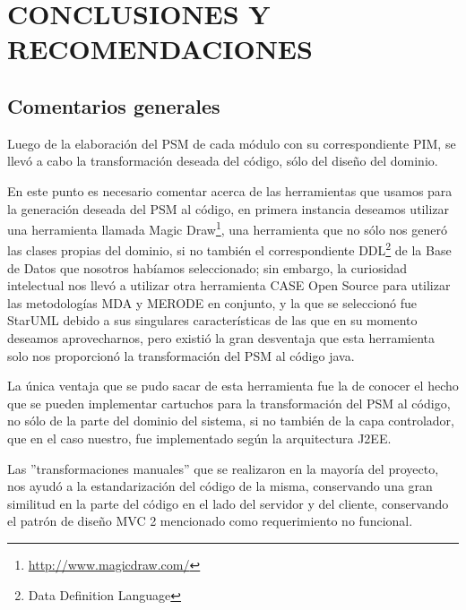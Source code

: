 \chapter*{CONCLUSIONES Y RECOMENDACIONES}
\section{Comentarios generales}

\begin{indentar}
Luego de la elaboraci\'on del PSM de cada m\'odulo con su correspondiente PIM, se llev\'o a cabo la transformaci\'on deseada del c\'odigo, s\'olo del dise\~no del dominio.

En este punto es necesario comentar acerca de las herramientas que usamos para la generaci\'on deseada del PSM al c\'odigo, en primera instancia deseamos utilizar una herramienta llamada Magic Draw\footnote{\url{http://www.magicdraw.com/}}, una herramienta que no s\'olo nos gener\'o las clases propias del dominio, si no tambi\'en el correspondiente DDL\footnote{Data Definition Language} de la Base de Datos que nosotros hab\'iamos seleccionado; sin embargo, la curiosidad intelectual nos llev\'o a utilizar otra herramienta CASE Open Source para utilizar las metodolog\'ias MDA y MERODE en conjunto, y la que se seleccion\'o fue StarUML debido a sus singulares caracter\'isticas de las que en su momento deseamos aprovecharnos, pero existi\'o la gran desventaja que esta herramienta solo nos proporcion\'o la transformaci\'on del PSM al c\'odigo java.

La \'unica ventaja que se pudo sacar de esta herramienta fue la de conocer el hecho que se pueden implementar cartuchos para la transformaci\'on del PSM al c\'odigo, no s\'olo de la parte del dominio del sistema, si no tambi\'en de la capa controlador, que en el caso nuestro, fue implementado seg\'un la arquitectura J2EE.

Las ''transformaciones manuales'' que se realizaron en la mayor\'ia del proyecto, nos ayud\'o a la estandarizaci\'on del c\'odigo de la misma, conservando una gran similitud en la parte del c\'odigo en el lado del servidor y del cliente, conservando el patr\'on de dise\~no MVC 2 mencionado como requerimiento no funcional.
\end{indentar}
